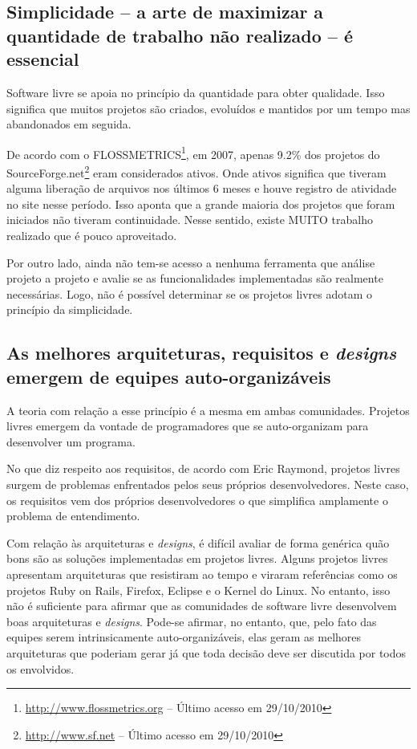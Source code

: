 
\subsection[Simplicidade é essencial]{Simplicidade -- a arte de
  maximizar a quantidade de trabalho não realizado -- é essencial}

Software livre se apoia no princípio da quantidade para obter
qualidade. Isso significa que muitos projetos são criados, evoluídos e
mantidos por um tempo mas abandonados em seguida.

De acordo com o
FLOSSMETRICS\footnote{\url{http://www.flossmetrics.org} -- Último
  acesso em 29/10/2010}, em 2007, apenas 9.2\% dos projetos do
SourceForge.net\footnote{\url{http://www.sf.net} -- Último acesso em
    29/10/2010} eram considerados ativos. Onde ativos significa que
tiveram alguma liberação de arquivos nos últimos 6 meses e houve
registro de atividade no site nesse período. Isso aponta que a grande
maioria dos projetos que foram iniciados não tiveram
continuidade. Nesse sentido, existe MUITO trabalho realizado que é
pouco aproveitado.

Por outro lado, ainda não tem-se acesso a nenhuma ferramenta que
análise projeto a projeto e avalie se as funcionalidades
implementadas são realmente necessárias. Logo, não é possível
determinar se os projetos livres adotam o princípio da simplicidade.

\subsection[Equipes auto-organizáveis]{As melhores arquiteturas,
  requisitos e \textit{designs} emergem de equipes auto-organizáveis}

A teoria com relação a esse princípio é a mesma em ambas
comunidades. Projetos livres emergem da vontade de programadores que
se auto-organizam para desenvolver um programa.

No que diz respeito aos requisitos, de acordo com Eric Raymond,
projetos livres surgem de problemas enfrentados pelos seus próprios
desenvolvedores. Neste caso, os requisitos vem dos próprios
desenvolvedores o que simplifica amplamente o problema de
entendimento.

Com relação às arquiteturas e \textit{designs}, é difícil avaliar de
forma genérica quão bons são as soluções implementadas em projetos
livres. Alguns projetos livres apresentam arquiteturas que resistiram
ao tempo e viraram referências como os projetos Ruby on Rails,
Firefox, Eclipse e o Kernel do Linux. No entanto, isso não é
suficiente para afirmar que as comunidades de software livre
desenvolvem boas arquiteturas e \textit{designs}. Pode-se afirmar, no
entanto, que, pelo fato das equipes serem intrinsicamente
auto-organizáveis, elas geram as melhores arquiteturas que poderiam
gerar já que toda decisão deve ser discutida por todos os envolvidos.

